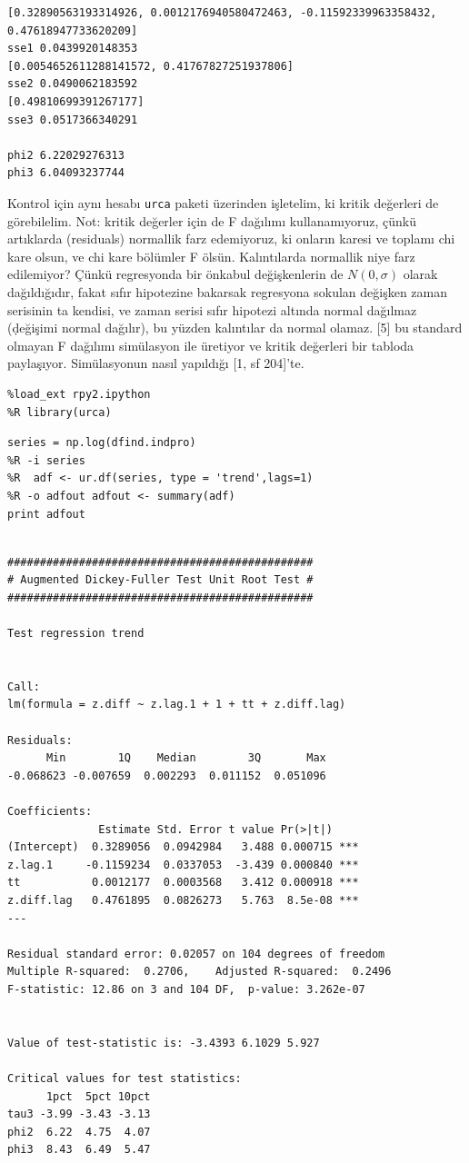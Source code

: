 \documentclass[12pt,fleqn]{article}\usepackage{../../common}
\begin{document}
\begin{verbatim}
[0.32890563193314926, 0.0012176940580472463, -0.11592339963358432, 0.47618947733620209]
sse1 0.0439920148353
[0.0054652611288141572, 0.41767827251937806]
sse2 0.0490062183592
[0.49810699391267177]
sse3 0.0517366340291

phi2 6.22029276313
phi3 6.04093237744
\end{verbatim}

Kontrol için aynı hesabı \verb!urca! paketi üzerinden işletelim, ki kritik
değerleri de görebilelim. Not: kritik değerler için de F dağılımı
kullanamıyoruz, çünkü artıklarda (residuals) normallik farz edemiyoruz, ki
onların karesi ve toplamı chi kare olsun, ve chi kare bölümler F
ölsün. Kalıntılarda normallik niye farz edilemiyor? Çünkü regresyonda bir
önkabul değişkenlerin de $N(0,\sigma)$ olarak dağıldığıdır, fakat sıfır
hipotezine bakarsak regresyona sokulan değişken zaman serisinin ta kendisi,
ve zaman serisi sıfır hipotezi altında normal dağılmaz ({\d değişimi}
normal dağılır), bu yüzden kalıntılar da normal olamaz. [5] bu standard
olmayan F dağılımı simülasyon ile üretiyor ve kritik değerleri bir tabloda
paylaşıyor. Simülasyonun nasıl yapıldığı [1, sf 204]'te. 

\begin{verbatim}
%load_ext rpy2.ipython
%R library(urca)
\end{verbatim}

\begin{verbatim}
series = np.log(dfind.indpro)
%R -i series
%R  adf <- ur.df(series, type = 'trend',lags=1)
%R -o adfout adfout <- summary(adf)
print adfout
\end{verbatim}

\begin{verbatim}

############################################### 
# Augmented Dickey-Fuller Test Unit Root Test # 
############################################### 

Test regression trend 


Call:
lm(formula = z.diff ~ z.lag.1 + 1 + tt + z.diff.lag)

Residuals:
      Min        1Q    Median        3Q       Max 
-0.068623 -0.007659  0.002293  0.011152  0.051096 

Coefficients:
              Estimate Std. Error t value Pr(>|t|)    
(Intercept)  0.3289056  0.0942984   3.488 0.000715 ***
z.lag.1     -0.1159234  0.0337053  -3.439 0.000840 ***
tt           0.0012177  0.0003568   3.412 0.000918 ***
z.diff.lag   0.4761895  0.0826273   5.763  8.5e-08 ***
---

Residual standard error: 0.02057 on 104 degrees of freedom
Multiple R-squared:  0.2706,	Adjusted R-squared:  0.2496 
F-statistic: 12.86 on 3 and 104 DF,  p-value: 3.262e-07


Value of test-statistic is: -3.4393 6.1029 5.927 

Critical values for test statistics: 
      1pct  5pct 10pct
tau3 -3.99 -3.43 -3.13
phi2  6.22  4.75  4.07
phi3  8.43  6.49  5.47
\end{verbatim}
\end{document}
